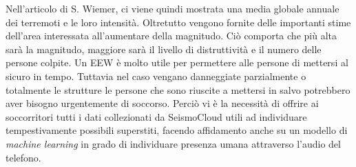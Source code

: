 \documentclass[main.tex]{subfiles}
\begin{document}
Nell'articolo di S. Wiemer, ci viene quindi mostrata una media globale annuale dei terremoti e le loro intensità. Oltretutto vengono fornite delle importanti stime dell'area interessata all'aumentare della magnitudo. Ciò comporta che più alta sarà la magnitudo, maggiore sarà il livello di distruttività e il numero delle persone colpite.\newline
Un EEW è molto utile per permettere alle persone di mettersi al sicuro in tempo. Tuttavia nel caso vengano danneggiate parzialmente o totalmente le strutture le persone che sono riuscite  a mettersi in salvo potrebbero aver bisogno urgentemente di soccorso. Perciò vi è la necessità di offrire ai soccorritori tutti i dati collezionati da SeismoCloud utili ad individuare tempestivamente possibili superstiti, facendo affidamento anche su un modello di \emph{machine learning} in grado di individuare presenza umana attraverso l'audio del telefono.
\end{document}
